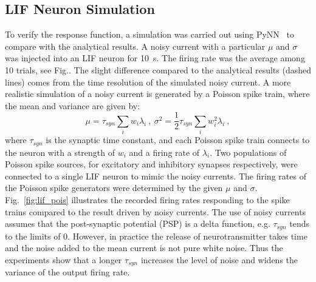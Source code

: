\documentclass[runningheads,a4paper]{llncs}
\begin{document}
	\subsection{LIF Neuron Simulation}
	To verify the response function, a simulation was carried out using PyNN~\cite{davison2008pynn} to compare with the analytical results.
	A noisy current with a particular $\mu$ and $\sigma$ was injected into an LIF neuron for 10~s.
	The firing rate was the average among 10 trials, see Fig..
	The slight difference compared to the analytical results (dashed lines) comes from the time resolution of the simulated noisy current.
	A more realistic simulation of a noisy current is generated by a Poisson spike train, 
	where the mean and variance are given by:
	\begin{equation}
	\mu = \tau_{syn}\sum_i w_i\lambda_{i}~,~\sigma^2=\frac{1}{2}\tau_{syn}\sum_i w_i^2\lambda_{i}~,
	\end{equation}
	where $\tau_{syn}$ is the synaptic time constant, and each Poisson spike train connects to the neuron with a strength of $w_i$ and a firing rate of $\lambda_i$.
	Two populations of Poisson spike sources, for excitatory and inhibitory synapses respectively, were connected to a single LIF neuron to mimic the noisy currents.
	The firing rates of the Poisson spike generators were determined by the given $\mu$ and $\sigma$.
	Fig.~\ref{fig:lif_pois} illustrates the recorded firing rates responding to the spike trains compared to the result driven by noisy currents.
	The use of noisy currents assumes that the post-synaptic potential (PSP) is a delta function, e.g. $\tau_{syn}$ tends to the limits of 0.
	However, in practice the release of neurotransmitter takes time and the noise added to the mean current is not pure white noise.
	Thus the experiments show that a longer $\tau_{syn}$ increases the level of noise and widens the variance of the output firing rate.
	
\end{document}

